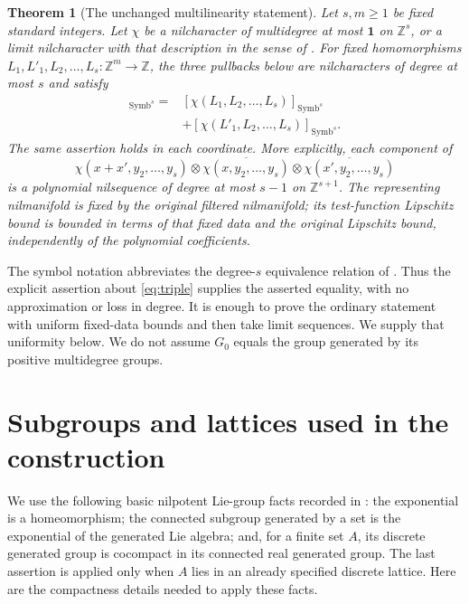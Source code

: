 \documentclass[11pt]{article}
\newtheorem{theorem}{Theorem}
\newcommand{\Z}{\mathbb Z}
\newcommand{\one}{\mathbf 1}
\newcommand{\Symb}{\operatorname{Symb}}
\begin{document}
\begin{theorem}[The unchanged multilinearity statement]\label{thm:main}
Let $s,m\geq1$ be fixed standard integers. Let $\chi$ be a nilcharacter of
multidegree at most $\one$ on $\Z^s$, or a limit nilcharacter with that
description in the sense of \cite[Sections 5--6]{GTZ}. For fixed homomorphisms
$L_1,L'_1,L_2,\ldots,L_s:\Z^m\longrightarrow\Z$, the three pullbacks below
are nilcharacters of degree at most $s$ and satisfy
\begin{align*}
 [\chi(L_1+L'_1,L_2,\ldots,L_s)]_{\Symb^s}
 ={}&[\chi(L_1,L_2,\ldots,L_s)]_{\Symb^s}\\
 &+[\chi(L'_1,L_2,\ldots,L_s)]_{\Symb^s}.
\end{align*}
The same assertion holds in each coordinate. More explicitly, each component
of
\begin{equation}\label{eq:triple}
 \chi(x+x',y_2,\ldots,y_s)\otimes
 \overline{\chi(x,y_2,\ldots,y_s)}\otimes
 \overline{\chi(x',y_2,\ldots,y_s)}
\end{equation}
is a polynomial nilsequence of degree at most $s-1$ on $\Z^{s+1}$.
The representing nilmanifold is fixed by the original filtered nilmanifold;
its test-function Lipschitz bound is bounded in terms of that fixed data and
the original Lipschitz bound, independently of the polynomial coefficients.
\end{theorem}

The symbol notation abbreviates the degree-$s$ equivalence relation of
\cite[Definitions 6.6 and 6.22]{GTZ}. Thus the explicit assertion about
\eqref{eq:triple} supplies the asserted equality, with no approximation or
loss in degree. It is enough to prove the ordinary statement with uniform
fixed-data bounds and then take limit sequences. We supply that uniformity
below. We do not assume $G_0$ equals the group generated by its positive
multidegree groups.

\section{Subgroups and lattices used in the construction}

We use the following basic nilpotent Lie-group facts recorded in
\cite[Section 3, pp.~1242--1243]{GTZ}: the exponential is a homeomorphism;
the connected subgroup generated by a set is the exponential of the generated
Lie algebra; and, for a finite set $A$, its discrete generated group is
cocompact in its connected real generated group. The last assertion is applied
only when $A$ lies in an already specified discrete lattice. Here are the
compactness details needed to apply these facts.
\end{document}
